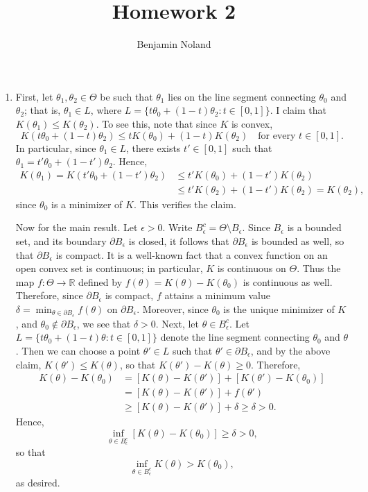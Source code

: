 \documentclass[12pt]{article}
\title{Homework 2}
\author{Benjamin Noland}
\date{}
\begin{document}
\maketitle

\begin{enumerate}
\item
First, let $\theta_1, \theta_2 \in \Theta$ be such that $\theta_1$ lies on the line segment connecting $\theta_0$ and $\theta_2$; that is, $\theta_1 \in L$, where $L = \{t\theta_0 + (1-t)\theta_2 : t \in [0, 1]\}$. I claim that $K(\theta_1) \leq K(\theta_2)$. To see this, note that since $K$ is convex,
\begin{equation*}
K(t\theta_0 + (1-t)\theta_2) \leq tK(\theta_0) + (1-t)K(\theta_2) \quad \text{for every $t \in [0, 1]$}.
\end{equation*}
In particular, since $\theta_1 \in L$, there exists $t' \in [0, 1]$ such that $\theta_1 = t'\theta_0 + (1-t')\theta_2$. Hence,
\begin{align*}
K(\theta_1) = K(t'\theta_0 + (1-t')\theta_2) &\leq t'K(\theta_0) + (1-t')K(\theta_2) \\
& \leq t'K(\theta_2) + (1-t')K(\theta_2) = K(\theta_2),
\end{align*}
since $\theta_0$ is a minimizer of $K$. This verifies the claim.

Now for the main result. Let $\epsilon > 0$. Write $B_\epsilon^c = \Theta \setminus B_\epsilon$. Since $B_\epsilon$ is a bounded set, and its boundary $\partial B_\epsilon$ is closed, it follows that $\partial B_\epsilon$ is bounded as well, so that $\partial B_\epsilon$ is compact. It is a well-known fact that a convex function on an open convex set is continuous; in particular, $K$ is continuous on $\Theta$. Thus the map $f : \Theta \to \mathbb{R}$ defined by $f(\theta) = K(\theta) - K(\theta_0)$ is continuous as well. Therefore, since $\partial B_\epsilon$ is compact, $f$ attains a minimum value $\delta = \min_{\theta \in \partial B_\epsilon} f(\theta)$ on $\partial B_\epsilon$. Moreover, since $\theta_0$ is the unique minimizer of $K$, and $\theta_0 \not \in \partial B_\epsilon$, we see that $\delta > 0$. Next, let $\theta \in B_\epsilon^c$. Let $L = \{t\theta_0 + (1-t)\theta : t \in [0, 1]\}$ denote the line segment connecting $\theta_0$ and $\theta$. Then we can choose a point $\theta' \in L$ such that $\theta' \in \partial B_\epsilon$, and by the above claim, $K(\theta') \leq K(\theta)$, so that $K(\theta') - K(\theta) \geq 0$. Therefore,
\begin{align*}
K(\theta) - K(\theta_0) &= [K(\theta) - K(\theta')] + [K(\theta') - K(\theta_0)] \\
&= [K(\theta) - K(\theta')] + f(\theta') \\
&\geq [K(\theta) - K(\theta')] + \delta \geq \delta > 0.
\end{align*}
Hence,
\begin{equation*}
\inf_{\theta \in B_\epsilon^c} [K(\theta) - K(\theta_0)] \geq \delta > 0,
\end{equation*}
so that
\begin{equation*}
\inf_{\theta \in B_\epsilon^c} K(\theta) > K(\theta_0),
\end{equation*}
as desired.


\end{enumerate}
\end{document}
